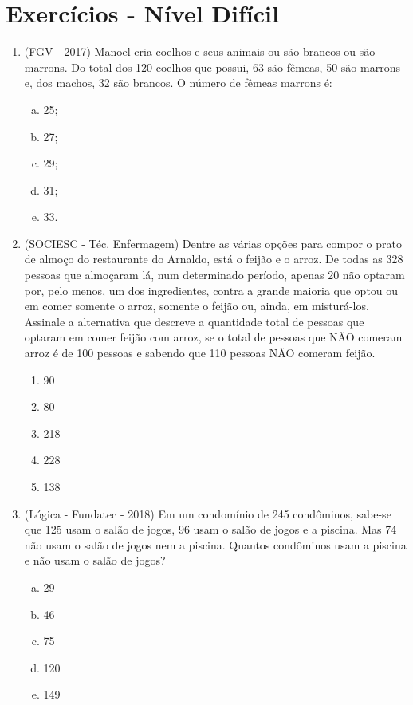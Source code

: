 \newpage
\section{Exercícios - Nível Difícil}

 \begin{enumerate}
  \item (FGV - 2017) Manoel cria coelhos e seus animais ou são brancos ou são marrons. Do total dos 120 coelhos que possui, 63 são fêmeas, 50 são marrons e, dos machos, 32 são brancos. O número de fêmeas marrons é:
  \begin{enumerate}[a)]
  \item 25;
  \item 27;
  \item 29;
  \item 31;
  \item 33.
  \end{enumerate}
  
   \item (SOCIESC - Téc. Enfermagem) Dentre as várias opções para compor o prato de almoço do restaurante do Arnaldo, está o feijão e o arroz. De todas as 328 pessoas que almoçaram lá, num determinado período, apenas 20 não optaram por, pelo menos, um dos ingredientes, contra a grande maioria que optou ou em comer somente o arroz, somente o feijão ou, ainda, em misturá-los. Assinale a alternativa que descreve a quantidade total de pessoas que optaram em comer feijão com arroz, se o total de pessoas que NÃO comeram arroz é de 100 pessoas e sabendo que 110 pessoas NÃO comeram feijão.
  \begin{enumerate}
  \item 90
  \item 80
  \item 218
  \item 228
  \item 138
 \end{enumerate}
 
  \item (Lógica - Fundatec - 2018) Em um condomínio de 245 condôminos, sabe-se que 125 usam o salão de jogos, 96 usam o salão de jogos e a piscina. Mas 74 não usam o salão de jogos nem a piscina. Quantos condôminos usam a piscina e não usam o salão de jogos?
  \begin{enumerate}[a)]
  \item 29
  \item 46
  \item 75
  \item 120
  \item 149
  \end{enumerate}

  
  \end{enumerate}
 

 




